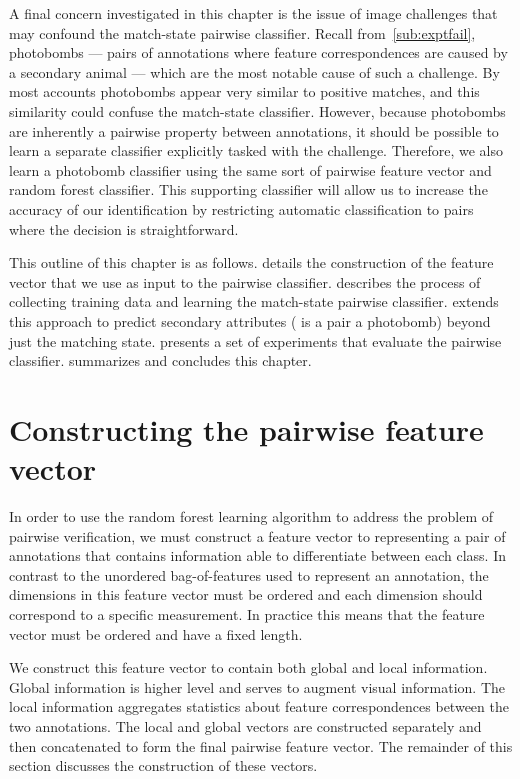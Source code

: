 A final concern investigated in this chapter is the issue of image challenges that may confound the match-state
  pairwise classifier.
Recall from~\cref{sub:exptfail}, {photobombs} --- pairs of annotations where feature correspondences are caused
  by a secondary animal --- which are the most notable cause of such a challenge.
By most accounts photobombs appear very similar to positive matches, and this similarity could confuse the
  match-state classifier.
However, because photobombs are inherently a pairwise property between annotations, it should be possible to
  learn a separate classifier explicitly tasked with the challenge.
Therefore, we also learn a photobomb classifier using the same sort of pairwise feature vector and random forest
  classifier.
This supporting classifier will allow us to increase the accuracy of our identification by restricting automatic
  classification to pairs where the decision is straightforward.


This outline of this chapter is as follows.
 details the construction of the feature vector that we use as input to the pairwise
  classifier.
 describes the process of collecting training data and learning the match-state pairwise
  classifier.
 extends this approach to predict secondary attributes (\eg{} is a pair a photobomb) beyond
  just the matching state.
 presents a set of experiments that evaluate the pairwise classifier.
 summarizes and concludes this chapter.


\section{Constructing the pairwise feature vector}\label{sec:pairfeat}

In order to use the random forest learning algorithm to address the problem of pairwise verification, we must
  construct a feature vector to representing a pair of annotations that contains information able to differentiate
  between each class.
In contrast to the unordered bag-of-features used to represent an annotation, the dimensions in this feature
  vector must be ordered and each dimension should correspond to a specific measurement.
In practice this means that the feature vector must be ordered and have a fixed length.

We construct this feature vector to contain both global and local information.
Global information is higher level and serves to augment visual information.
The local information aggregates statistics about feature correspondences between the two annotations.
The local and global vectors are constructed separately and then concatenated to form the final pairwise feature
  vector.
The remainder of this section discusses the construction of these vectors.

